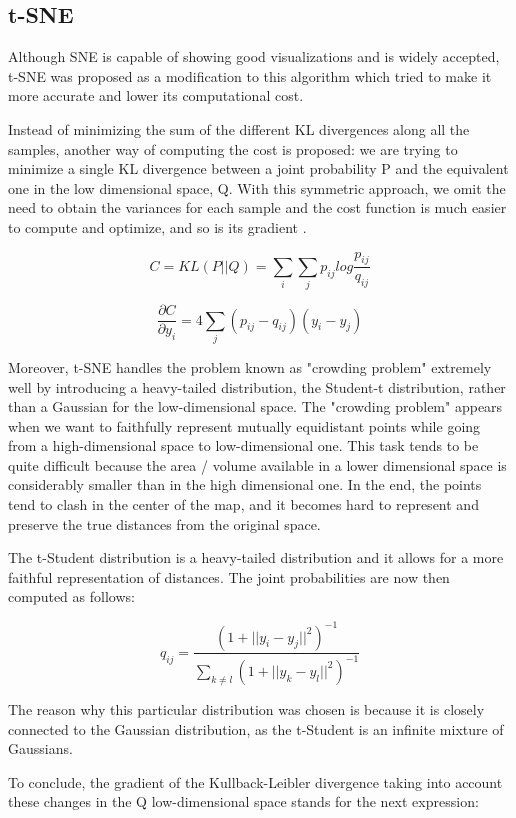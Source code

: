 \documentclass[a4paper,11pt,spanish]{report}
\begin{document}
\subsection{t-SNE}
\label{ssec:tsne}

Although SNE is capable of showing good visualizations and is widely accepted, t-SNE was proposed as a modification to this algorithm which tried to make it more accurate and lower its computational cost.

Instead of minimizing the sum of the different KL divergences along all the samples, another way of computing the cost is proposed: we are trying to minimize a single KL divergence between a joint probability P and the equivalent one in the low dimensional space, Q. With this symmetric approach, we omit the need to obtain the variances for each sample and the cost function is much easier to compute and optimize, and so is its gradient \citep{tsne}.

$$ C = KL(P||Q) = \sum\limits_{i} \sum\limits_{j} p_{ij} log \frac{p_{ij}}{q_{ij}}$$

$$ \frac{\partial C}{\partial y_{i}} = 4 \sum\limits_j (p_{ij} - q_{ij}) (y_{i} - y_{j}) $$

Moreover, t-SNE handles the problem known as "crowding problem" extremely well by introducing a heavy-tailed distribution, the Student-t distribution, rather than a Gaussian for the low-dimensional space. The "crowding problem" appears when we want to faithfully represent mutually equidistant points while going from a high-dimensional space to low-dimensional one. This task tends to be quite difficult because the area / volume available in a lower dimensional space is considerably smaller than in the high dimensional one. In the end, the points tend to clash in the center of the map, and it becomes hard to represent and preserve the true distances from the original space.

The t-Student distribution is a heavy-tailed distribution and it allows for a more faithful representation of distances. The joint probabilities are now then computed as follows:

$$ q_{ij} = \frac{(1+ ||y_{i}-y_{j}||^2)^{-1}} {\sum\limits_{k\neq l} (1+ ||y_{k}-y_{l}||^2)^{-1} }$$

The reason why this particular distribution was chosen is because it is closely connected to the Gaussian distribution, as the t-Student is an infinite mixture of Gaussians.

To conclude, the gradient of the Kullback-Leibler divergence taking into account these changes in the Q low-dimensional space stands for the next expression:
\end{document}
